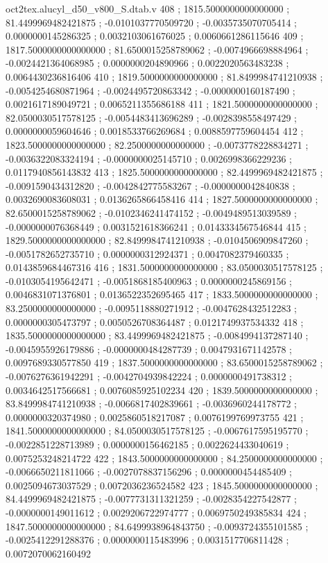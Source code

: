 \begin{filecontents}[overwrite]{oct2tex.alucyl_d50_v800_S.dtab.v}
408 ; 1815.5000000000000000 ; 81.4499969482421875 ; -0.0101037770509720 ; -0.0035735070705414 ; 0.0000000145286325 ; 0.0032103061676025 ; 0.0060661286115646
409 ; 1817.5000000000000000 ; 81.6500015258789062 ; -0.0074966698884964 ; -0.0024421364068985 ; 0.0000000204890966 ; 0.0022020563483238 ; 0.0064430236816406
410 ; 1819.5000000000000000 ; 81.8499984741210938 ; -0.0054254680871964 ; -0.0024495720863342 ; -0.0000000160187490 ; 0.0021617189049721 ; 0.0065211355686188
411 ; 1821.5000000000000000 ; 82.0500030517578125 ; -0.0054483413696289 ; -0.0028398558497429 ; 0.0000000059604646 ; 0.0018533766269684 ; 0.0088597759604454
412 ; 1823.5000000000000000 ; 82.2500000000000000 ; -0.0073778228834271 ; -0.0036322083324194 ; -0.0000000025145710 ; 0.0026998366229236 ; 0.0117940856143832
413 ; 1825.5000000000000000 ; 82.4499969482421875 ; -0.0091590434312820 ; -0.0042842775583267 ; -0.0000000042840838 ; 0.0032690083608031 ; 0.0136265866458416
414 ; 1827.5000000000000000 ; 82.6500015258789062 ; -0.0102346241474152 ; -0.0049489513039589 ; -0.0000000076368449 ; 0.0031521618366241 ; 0.0143334567546844
415 ; 1829.5000000000000000 ; 82.8499984741210938 ; -0.0104506909847260 ; -0.0051782652735710 ; 0.0000000312924371 ; 0.0047082379460335 ; 0.0143859684467316
416 ; 1831.5000000000000000 ; 83.0500030517578125 ; -0.0103054195642471 ; -0.0051868185400963 ; 0.0000000245869156 ; 0.0046831071376801 ; 0.0136522352695465
417 ; 1833.5000000000000000 ; 83.2500000000000000 ; -0.0095118880271912 ; -0.0047628432512283 ; 0.0000000305473797 ; 0.0050526708364487 ; 0.0121749937534332
418 ; 1835.5000000000000000 ; 83.4499969482421875 ; -0.0084994137287140 ; -0.0045955926179886 ; -0.0000000484287739 ; 0.0047931671142578 ; 0.0097689330577850
419 ; 1837.5000000000000000 ; 83.6500015258789062 ; -0.0076276361942291 ; -0.0042704939842224 ; 0.0000000491738312 ; 0.0034642517566681 ; 0.0076085925102234
420 ; 1839.5000000000000000 ; 83.8499984741210938 ; -0.0066817402839661 ; -0.0036960244178772 ; 0.0000000320374980 ; 0.0025860518217087 ; 0.0076199769973755
421 ; 1841.5000000000000000 ; 84.0500030517578125 ; -0.0067617595195770 ; -0.0022851228713989 ; 0.0000000156462185 ; 0.0022624433040619 ; 0.0075253248214722
422 ; 1843.5000000000000000 ; 84.2500000000000000 ; -0.0066650211811066 ; -0.0027078837156296 ; 0.0000000454485409 ; 0.0025094673037529 ; 0.0072036236524582
423 ; 1845.5000000000000000 ; 84.4499969482421875 ; -0.0077731311321259 ; -0.0028354227542877 ; -0.0000000149011612 ; 0.0029206722974777 ; 0.0069750249385834
424 ; 1847.5000000000000000 ; 84.6499938964843750 ; -0.0093724355101585 ; -0.0025412291288376 ; 0.0000000115483996 ; 0.0031517706811428 ; 0.0072070062160492

\end{filecontents}
